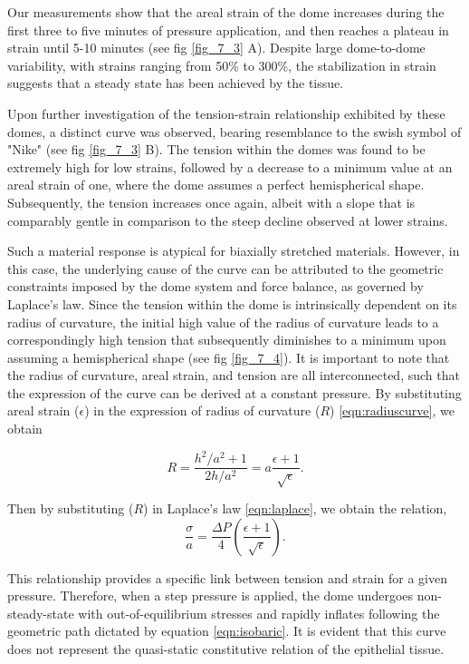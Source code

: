 Our measurements show that the areal strain of the dome increases during the first three to five minutes of pressure application, and then reaches a plateau in strain until 5-10 minutes (see fig \ref{fig_7_3} A). Despite large dome-to-dome variability, with strains ranging from 50\% to 300\%, the stabilization in strain suggests that a steady state has been achieved by the tissue.

Upon further investigation of the tension-strain relationship exhibited by these domes, a distinct curve was observed, bearing resemblance to the swish symbol of "Nike" (see fig \ref{fig_7_3} B). The tension within the domes was found to be extremely high for low strains, followed by a decrease to a minimum value at an areal strain of one, where the dome assumes a perfect hemispherical shape. Subsequently, the tension increases once again, albeit with a slope that is comparably gentle in comparison to the steep decline observed at lower strains.

Such a material response is atypical for biaxially stretched materials. However, in this case, the underlying cause of the curve can be attributed to the geometric constraints imposed by the dome system and force balance, as governed by Laplace's law. Since the tension within the dome is intrinsically dependent on its radius of curvature, the initial high value of the radius of curvature leads to a correspondingly high tension that subsequently diminishes to a minimum upon assuming a hemispherical shape (see fig \ref{fig_7_4}). It is important to note that the radius of curvature, areal strain, and tension are all interconnected, such that the expression of the curve can be derived at a constant pressure.
By substituting areal strain ($\epsilon$) in the expression of radius of curvature ($R$) \ref{eqn:radiuscurve}, we obtain

\begin{equation}
	R = \frac{h^2/a^2 + 1}{2h/a^2} = a\frac{\epsilon + 1}{\sqrt{\epsilon}}.
\end{equation}

Then by substituting ($R$) in Laplace’s law \ref{eqn:laplace}, we obtain the relation,
\begin{equation}
		\label{eqn:isobaric}
	\frac{\sigma}{a} = \frac{\Delta P}{4} \left( \frac{\epsilon + 1}{\sqrt{\epsilon}} \right).
\end{equation}

This relationship provides a specific link between tension and strain for a given pressure. Therefore, when a step pressure is applied, the dome undergoes non-steady-state with out-of-equilibrium stresses and rapidly inflates following the geometric path dictated by equation \ref{eqn:isobaric}. It is evident that this curve does not represent the quasi-static constitutive relation of the epithelial tissue.



